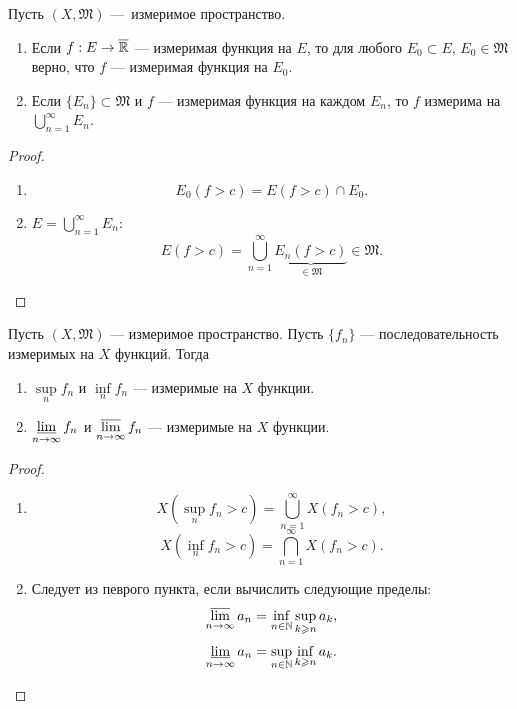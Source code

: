 \begin{theorem}
    Пусть $(X, \mathfrak{M})$ — измеримое пространство.
    \begin{enumerate}
        \item Если $f: E \to \overline{\mathbb{R}}$ — измеримая функция на $E$, то для любого $E_0 \subset E$, $E_0 \in \mathfrak{M}$ верно, что $f$ — измеримая функция на $E_0$.
        \item Если $\{E_n\} \subset \mathfrak{M}$ и $f$ — измеримая функция на каждом $E_n$, то $f$ измерима на $\bigcup\limits_{n=1}^{\infty}E_n$.
    \end{enumerate}
\end{theorem} 
\begin{proof}\tab

    \begin{enumerate}
        \item $$E_0(f>c) = E(f>c) \cap E_0.$$
        \item $E = \bigcup\limits_{n=1}^{\infty}E_n$:
        \[E(f>c) = \bigcup\limits_{n=1}^{\infty}\underbrace{E_n(f>c)}_{\in \mathfrak{M}} \in \mathfrak{M}.\]
    \end{enumerate}
\end{proof} 

\begin{theorem}
    Пусть $(X, \mathfrak{M})$ — измеримое пространство.
    Пусть $\{f_n\}$ — последовательность измеримых на $X$ функций.
    Тогда
    \begin{enumerate}
        \item $\sup\limits_n f_n$ и $\inf\limits_n f_n$ — измеримые на $X$ функции.
        \item $\operatorname*{\underline{lim}}\limits_{n\to \infty} f_n$ и $\operatorname*{\overline{lim}}\limits_{n \to \infty} f_n$ — измеримые на $X$ функции.
    \end{enumerate}
\end{theorem} 
\begin{proof}\tab

    \begin{enumerate}
        \item $$X(\sup\limits_n f_n > c) = \bigcup\limits_{n=1}^{\infty} X(f_n > c),$$
        $$X(\inf\limits_n f_n > c) = \bigcap\limits_{n=1}^{\infty}X(f_n > c).$$

        \item Следует из певрого пункта, если вычислить следующие пределы:
        \[\operatorname*{\overline{lim}}\limits_{n \to \infty} a_n = \inf\limits_{n \in \mathbb{N}} \sup\limits_{k \geqslant n} a_k,\]
        \[\operatorname*{\underline{lim}}\limits_{n \to \infty} a_n = \sup\limits_{n \in \mathbb{N}} \inf\limits_{k \geqslant n} a_k.\]
    \end{enumerate}
\end{proof} 

